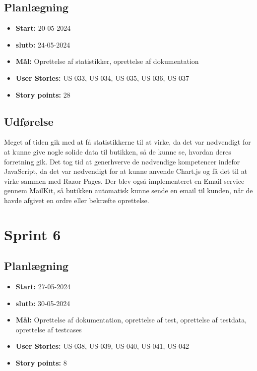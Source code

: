 \subsection{Planlægning}
\label{subsec:sprint-5-plan}
\begin{itemize}
    \item \textbf{Start:} 20-05-2024
    \item \textbf{slutb:} 24-05-2024
    \item \textbf{Mål:} Oprettelse af statistikker, oprettelse af dokumentation
    \item \textbf{User Stories:} US-033, US-034, US-035, US-036, US-037
    \item \textbf{Story points:} 28
\end{itemize}

\subsection{Udførelse}
\label{subsec:sprint-5-udforelse}
Meget af tiden gik med at få statistikkerne til at virke, da det var nødvendigt for at kunne give nogle solide data til butikken, så de kunne se, hvordan deres forretning gik.
Det tog tid at generhverve de nødvendige kompetencer indefor JavaScript, da det var nødvendigt for at kunne anvende Chart.js og få det til at virke sammen med Razor Pages.
Der blev også implementeret en Email service gennem MailKit, så butikken automatisk kunne sende en email til kunden, når de havde afgivet en ordre eller bekræfte oprettelse.

\section{Sprint 6}
\label{sec:sprint-6}
\subsection{Planlægning}
\label{subsec:sprint-6-plan}
\begin{itemize}
    \item \textbf{Start:} 27-05-2024
    \item \textbf{slutb:} 30-05-2024
    \item \textbf{Mål:} Oprettelse af dokumentation, oprettelse af test, oprettelse af testdata, oprettelse af testcases
    \item \textbf{User Stories:} US-038, US-039, US-040, US-041, US-042
    \item \textbf{Story points:} 8
\end{itemize}

